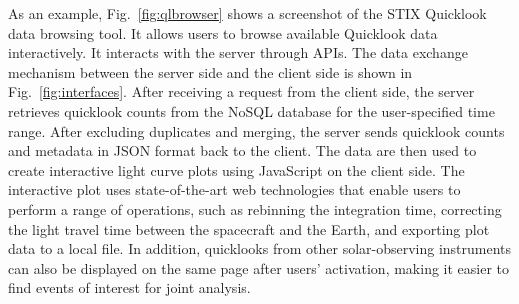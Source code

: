 \documentclass[referee]{aa} %
\begin{document}
As an example, Fig.~\ref{fig:qlbrowser} shows a screenshot of the STIX Quicklook data browsing 
tool. It allows users to browse available Quicklook data interactively. It 
interacts with the server through APIs.
The data exchange mechanism between the server side and the client side is shown in  
Fig.~\ref{fig:interfaces}. 
After receiving a request from the client side, the server retrieves quicklook counts from the NoSQL database for the user-specified time range. 
After excluding duplicates and merging,  the server sends quicklook counts and metadata in JSON format back to the client. The data are then used to create interactive light curve plots using JavaScript on the client side. 
The interactive plot uses state-of-the-art web technologies that enable users to perform a range of operations, such as rebinning the integration time, correcting the light travel time between the spacecraft and the Earth, and exporting plot data to a local file.
In addition, quicklooks from other solar-observing instruments can also be displayed on the same page after users' activation, 
making it easier to find events of interest for joint analysis.
\end{document}
